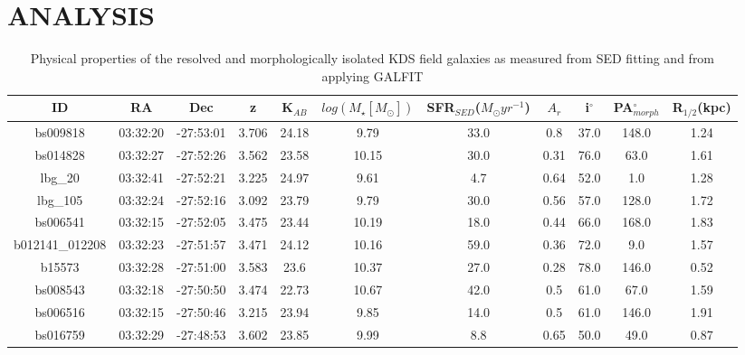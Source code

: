 \documentclass[fleqn,usenatbib]{mn2e}
\begin{document}
\section{ANALYSIS}\label{sec:analysis}

\begin{table*}
\centering
\begin{threeparttable}
\caption{Physical properties of the resolved and morphologically isolated KDS field galaxies as measured from SED fitting and from applying GALFIT \protect\citep{Peng2010_galfit}}
\label{tab:phys-props}
\begin{tabular}{ccccccccccc}


 \hline
ID              & RA       & Dec       & z     & K$_{AB}$     & $log(M_{\star}[M_{\odot}])$ & SFR$_{SED}$($M_{\odot}yr^{-1}$) & $A_{r}$ & i$^{\circ}$ & PA$_{morph}^{\circ}$ & R$_{1/2}$(kpc) \\
 \hline
bs009818        & 03:32:20 & -27:53:01 & 3.706        & 24.18  & 9.79  & 33.0 & 0.8         & 37.0        & 148.0   & 1.24      \\
bs014828        & 03:32:27 & -27:52:26 & 3.562        & 23.58  & 10.15 & 30.0 & 0.31        & 76.0        & 63.0    & 1.61      \\
lbg\_20         & 03:32:41 & -27:52:21 & 3.225        & 24.97  & 9.61  & 4.7  & 0.64        & 52.0        & 1.0     & 1.28      \\
lbg\_105        & 03:32:24 & -27:52:16 & 3.092      & 23.79  & 9.79  & 30.0 & 0.56        & 57.0        & 128.0   & 1.72      \\
bs006541        & 03:32:15 & -27:52:05 & 3.475       & 23.44  & 10.19 & 18.0 & 0.44        & 66.0        & 168.0   & 1.83      \\
b012141\_012208 & 03:32:23 & -27:51:57 & 3.471        & 24.12  & 10.16 & 59.0 & 0.36        & 72.0        & 9.0     & 1.57      \\
b15573          & 03:32:28 & -27:51:00 & 3.583        & 23.6   & 10.37 & 27.0 & 0.28        & 78.0        & 146.0   & 0.52      \\
bs008543        & 03:32:18 & -27:50:50 & 3.474        & 22.73  & 10.67 & 42.0 & 0.5         & 61.0        & 67.0    & 1.59      \\
bs006516        & 03:32:15 & -27:50:46 & 3.215        & 23.94  & 9.85  & 14.0 & 0.5         & 61.0        & 146.0   & 1.91      \\
bs016759        & 03:32:29 & -27:48:53 & 3.602       & 23.85  & 9.99  & 8.8  & 0.65        & 50.0        & 49.0    & 0.87      \\

\end{tabular}
\end{threeparttable}
\end{table*}
\end{document}
